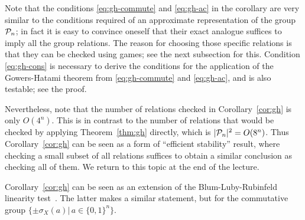 Note that the conditions \eqref{eq:gh-commute} and \eqref{eq:gh-ac} in the corollary are very similar to the conditions required of an approximate representation of the group $\mathcal{P}_n$; in fact it is easy to convince oneself that their exact analogue suffices to imply all the group relations. The reason for choosing those specific relations is that they can be checked using games; see the next subsection for this. Condition \eqref{eq:gh-cons} is necessary to derive the conditions for the application of the Gowers-Hatami theorem from \eqref{eq:gh-commute} and \eqref{eq:gh-ac}, and is also testable; see the proof. 

Nevertheless, note that the number of relations checked in Corollary~\ref{cor:gh} is only $O(4^n)$. This is in contrast to the number of relations that would be checked by applying Theorem~\ref{thm:gh} directly, which is $|\mathcal{P}_n|^2=O(8^n)$. Thus Corollary~\ref{cor:gh} can be seen as a form of ``efficient stability'' result, where checking a small subset of all relations suffices to obtain a similar conclusion as checking all of them. We return to this topic at the end of the lecture. 



\begin{remark}
Corollary~\ref{cor:gh} can be seen as an extension of the Blum-Luby-Rubinfeld linearity test~\cite{blum1993self}. The latter makes a similar statement, but for the commutative group $\{\pm\sigma_X(a)|\, a\in\{0,1\}^n\}$. 
\end{remark}


